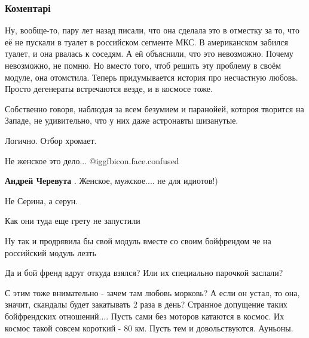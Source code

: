  
 
 
 
 
\subsubsection{Коментарі}
\label{sec:03_12_2021.fb.dudkin_jurij.1.kosmos.cmt}

\begin{itemize} %

Ну, вообще-то, пару лет назад писали, что она сделала это в отместку за то, что
её не пускали в туалет в российском сегменте МКС. В американском забился
туалет, и она рвалась к соседям. А ей объяснили, что это невозможно. Почему
невозможно, не помню. Но вместо того, чтоб решить эту проблему в своём модуле,
она отомстила. Теперь придумывается история про несчастную любовь. Просто
дегенераты встречаются везде, и в космосе тоже.


Собственно говоря, наблюдая за всем безумием и паранойей, котороя творится на
Западе, не удивительно, что у них даже астронавты шизанутые.

Логично. Отбор хромает.

Не женское это дело... @igg{fbicon.face.confused} 

\textbf{Андрей Черевута} . Женское, мужское.... не для идиотов!)

Не Серина, а серун.

Как они туда еще грету не запустили

Ну так и продрявила бы свой модуль вместе со своим бойфрендом че на российский модуль лезть

Да и бой френд вдруг откуда взялся? Или их специально парочкой заслали?

С этим тоже внимательно - зачем там любовь морковь? А если он устал, то она, значит, скандалы будет закатывать 2 раза в день?
Странное допущение таких бойфрендских отношений....
Пусть сами без моторов катаются в космос.
Их космос такой совсем короткий - 80 км. Пусть тем и довольствуются. Ауньоны.


\end{itemize}
